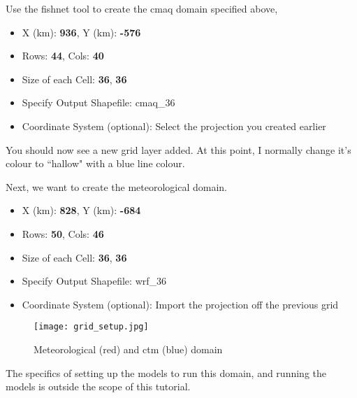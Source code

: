 Use the fishnet tool to create the \acs{cmaq} domain specified above, \ie
\begin{itemize}
	\item X (km): \textbf{936}, Y (km): \textbf{-576}
	\item Rows: \textbf{44}, Cols: \textbf{40}
	\item Size of each Cell: \textbf{36}, \textbf{36}
	\item Specify Output Shapefile: \acs{cmaq}\_36
	\item Coordinate System (optional): Select the projection you created earlier
\end{itemize}

You should now see a new grid layer added.  At this point, I normally change it's colour to ``hallow" with a blue line colour.

Next, we want to create the meteorological domain.

\begin{itemize}
	\item X (km): \textbf{828}, Y (km): \textbf{-684}
	\item Rows: \textbf{50}, Cols: \textbf{46}
	\item Size of each Cell: \textbf{36}, \textbf{36}
	\item Specify Output Shapefile: \acs{wrf}\_36
	\item Coordinate System (optional): Import the projection off the previous grid
\end{itemize}

\begin{figure}
	\centering
	\texttt{[image: grid\_setup.jpg]}
	\caption{Meteorological (red) and \acs{ctm} (blue) domain}
	\label{grid_setup}
\end{figure}

The specifics of setting up the models to run this domain, and running the models is outside the scope of this tutorial.


